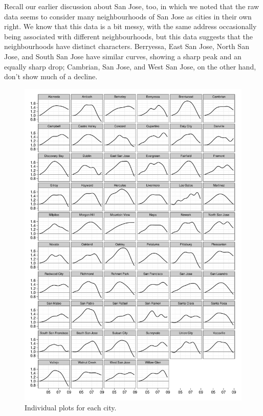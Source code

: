 \documentclass[oneside]{article}
\begin{document}

Recall our earlier discussion about San Jose, too, in which we noted that the raw data seems to consider many neighbourhoods of San Jose as cities in their own right.  We know that this data is a bit messy, with the same address occasionally being associated with different neighbourhoods, but this data suggests that the neighbourhoods have distinct characters.  Berryessa, East San Jose, North San Jose, and South San Jose have similar curves, showing a sharp peak and an equally sharp drop;  Cambrian, San Jose, and West San Jose, on the other hand, don't show much of a decline.

\begin{figure}[htbp]
  \centering
  \includegraphics[width=0.9\linewidth]{cities-individual}
  \caption{Individual plots for each city.}
  \label{fig:individual}
\end{figure}
\end{document}
